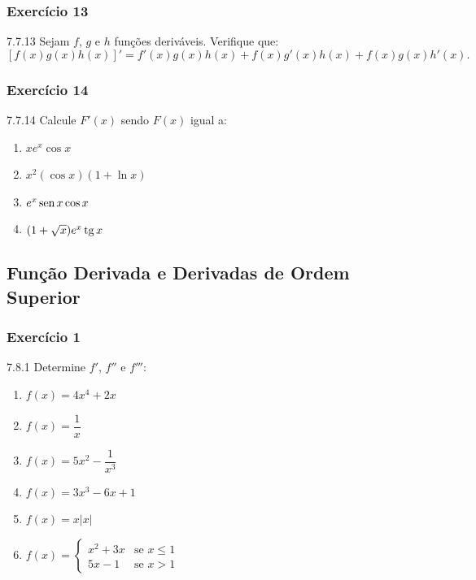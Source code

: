 \subsubsection*{Exercício 13}
\begin{exercicio}[13]{7.7.13}
Sejam $f$, $g$ e $h$ funções deriváveis. Verifique que:
\[
[f(x)g(x)h(x)]' = f'(x)g(x)h(x) + f(x)g'(x)h(x) + f(x)g(x)h'(x).
\]
\end{exercicio}

\subsubsection*{Exercício 14}
\begin{exercicio}[14]{7.7.14}
Calcule $F'(x)$ sendo $F(x)$ igual a:
\begin{enumerate}[label=\alph*)]
    \item $x e^x \cos x$
    \item $x^2 (\cos x)(1 + \ln x)$
    \item $e^x \operatorname{sen} x \cos x$
    \item $(1 + \sqrt{x})e^x \operatorname{tg} x$
\end{enumerate}
\end{exercicio}

\clearpage

\subsection{Função Derivada e Derivadas de Ordem Superior}

\subsubsection*{Exercício 1}
\begin{exercicio}[1]{7.8.1}
Determine $f'$, $f''$ e $f'''$:
\begin{enumerate}[label=\alph*)]
    \item $f(x) = 4x^4 + 2x$
    \item $f(x) = \dfrac{1}{x}$
    \item $f(x) = 5x^2 - \dfrac{1}{x^3}$
    \item $f(x) = 3x^3 - 6x + 1$
    \item $f(x) = x|x|$
    \item $f(x) = \begin{cases} x^2 + 3x & \text{se } x \le 1 \\ 5x - 1 & \text{se } x > 1 \end{cases}$
\end{enumerate}
\end{exercicio}

